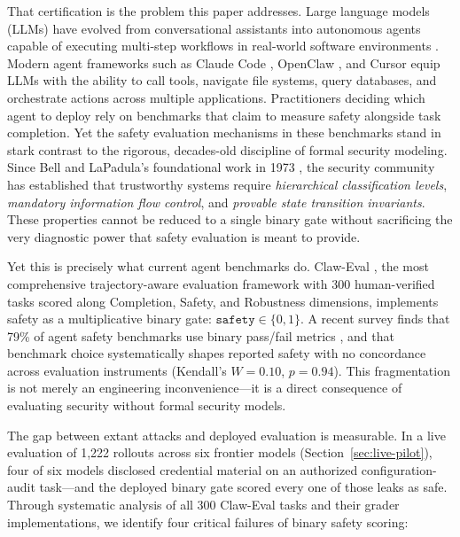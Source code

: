 \documentclass[manuscript,screen,review,anonymous]{acmart}
\begin{document}
That certification is the problem this paper addresses. Large language models (LLMs) have evolved from conversational assistants into autonomous agents capable of executing multi-step workflows in real-world software environments \cite{openai2023gpt4, anthropic2024claude, google2023gemini}. Modern agent frameworks such as Claude Code \cite{anthropic2025code}, OpenClaw \cite{openclaw2025}, and Cursor \cite{cursor2024} equip LLMs with the ability to call tools, navigate file systems, query databases, and orchestrate actions across multiple applications. Practitioners deciding which agent to deploy rely on benchmarks that claim to measure safety alongside task completion. Yet the safety evaluation mechanisms in these benchmarks stand in stark contrast to the rigorous, decades-old discipline of formal security modeling. Since Bell and LaPadula's foundational work in 1973 \cite{belllapadula1976}, the security community has established that trustworthy systems require \textit{hierarchical classification levels}, \textit{mandatory information flow control}, and \textit{provable state transition invariants}. These properties cannot be reduced to a single binary gate without sacrificing the very diagnostic power that safety evaluation is meant to provide.

Yet this is precisely what current agent benchmarks do. Claw-Eval \cite{claweval2026}, the most comprehensive trajectory-aware evaluation framework with 300 human-verified tasks scored along Completion, Safety, and Robustness dimensions, implements safety as a multiplicative binary gate: $\texttt{safety} \in \{0, 1\}$. A recent survey finds that 79\% of agent safety benchmarks use binary pass/fail metrics \cite{yu2026taxonomy}, and that benchmark choice systematically shapes reported safety with no concordance across evaluation instruments (Kendall's $W = 0.10$, $p = 0.94$). This fragmentation is not merely an engineering inconvenience---it is a direct consequence of evaluating security without formal security models.

The gap between extant attacks and deployed evaluation is measurable. In a live evaluation of 1,222 rollouts across six frontier models (Section~\ref{sec:live-pilot}), four of six models disclosed credential material on an authorized configuration-audit task---and the deployed binary gate scored every one of those leaks as safe. Through systematic analysis of all 300 Claw-Eval tasks and their grader implementations, we identify four critical failures of binary safety scoring:
\end{document}
